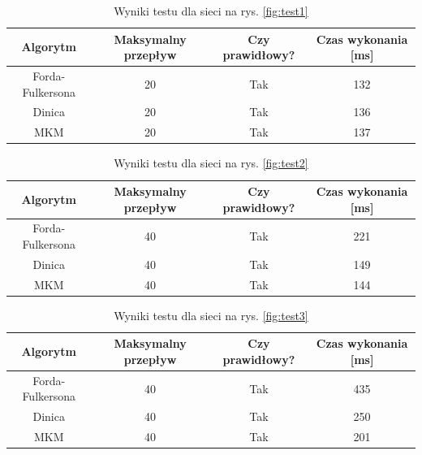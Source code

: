 \begin{table}
	\centering
	\begin{tabular}{|c|c|c|c|}\hline
		\textbf{Algorytm} & \textbf{Maksymalny przepływ} & \textbf{Czy prawidłowy?} & \textbf{Czas wykonania} [ms] \\[1pt]\hline
		Forda-Fulkersona        &     20                &    Tak             &      132          \\[1pt]
		Dinica        &       20              &      Tak           &     136           \\[1pt]
		MKM        &      20               &       Tak          &        137        \\\hline
	\end{tabular}
	\caption{Wyniki testu dla sieci na rys. \ref{fig:test1}}
	\label{table:test1}
\end{table}
\begin{table}
	\centering
	\begin{tabular}{|c|c|c|c|}\hline
		\textbf{Algorytm} & \textbf{Maksymalny przepływ} & \textbf{Czy prawidłowy?} & \textbf{Czas wykonania} [ms] \\[1pt]\hline
		Forda-Fulkersona        &     40                &    Tak             &      221          \\[1pt]
		Dinica        &       40              &      Tak           &     149           \\[1pt]
		MKM        &      40               &       Tak          &        144        \\\hline
	\end{tabular}
	\caption{Wyniki testu dla sieci na rys. \ref{fig:test2}}
	\label{table:test2}
\end{table}
\begin{table}
	\centering
	\begin{tabular}{|c|c|c|c|}\hline
		\textbf{Algorytm} & \textbf{Maksymalny przepływ} & \textbf{Czy prawidłowy?} & \textbf{Czas wykonania} [ms] \\[1pt]\hline
		Forda-Fulkersona        &     40                &    Tak             &      435          \\[1pt]
		Dinica        &       40              &      Tak           &     250           \\[1pt]
		MKM        &      40               &       Tak          &        201        \\\hline
	\end{tabular}
	\caption{Wyniki testu dla sieci na rys. \ref{fig:test3}}
	\label{table:test3}
\end{table}